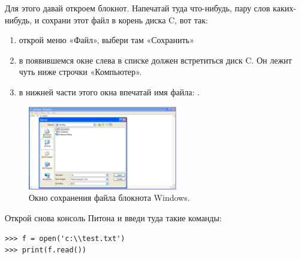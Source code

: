 \begin{WINDOWS}

Для этого давай откроем блокнот. Напечатай туда что-нибудь, пару слов каких-нибудь, и сохрани этот файл в корень диска C, вот так:

\begin{enumerate}
 \item открой меню «Файл», выбери там «Сохранить»
 \item в появившемся окне слева в списке должен встретиться диск C. Он лежит чуть ниже строчки «Компьютер».
 \item в нижней части этого окна впечатай имя файла: .
\end{enumerate}

\begin{figure}
\begin{center}
\includegraphics[width=65mm]{../en/figure17.eps}
\end{center}
\caption{Окно сохранения файла блокнота Windows.}\label{fig17}
\end{figure}

Открой снова консоль Питона и введи туда такие команды:

\begin{listing}
\begin{verbatim}
>>> f = open('c:\\test.txt')
>>> print(f.read())
\end{verbatim}
\end{listing}
\end{WINDOWS}

